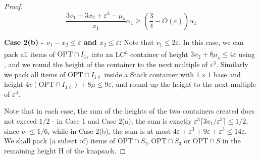 \documentclass[10pt,a4paper]{amsart}
\renewcommand{\epsilon}{\varepsilon} %
\theoremstyle{definition}
\newcommand{\HH}{\mathrm{H}}
\begin{document}
\begin{proof}
    
    
    \[ \frac{3v_1-3x_2+\epsilon^3-\mu_s}{x_1}\alpha_1 \ge \left(\frac{3}{4}-O(\epsilon)\right)\alpha_1 \]
    
    \textbf{Case 2(b) - $v_1-x_2 \le \epsilon$ and $x_2\le \epsilon$:} Note that $v_1\le 2\epsilon$. In this case, we can pack all items of $\text{OPT}\cap I_{1s}$ into an LC\textsuperscript{a} container of height $3x_2+8\mu_s \le 4\epsilon$ using , and we round the height of the container to the next multiple of $\epsilon^3$. Similarly we pack all items of $\text{OPT}\cap I_{1\ell}$ inside a Stack container with $1\times 1$ base and height $4v(\text{OPT}\cap I_{1\ell})+8\mu \le 9\epsilon$, and round up the height to the next multiple of $\epsilon^3$. 

    Note that in each case, the sum of the heights of the two containers created does not exceed $1/2$ - in Case 1 and Case 2(a), the sum is exactly $\epsilon^3\lceil 3v_1/\epsilon^3\rceil \le 1/2$, since $v_1\le 1/6$, while in Case 2(b), the sum is at most $4\epsilon + \epsilon^3+9\epsilon+\epsilon^3 \le 14\epsilon$. We shall pack (a subset of) items of $\text{OPT}\cap S_2, \text{OPT}\cap S_3$ or $\text{OPT}\cap S$ in the remaining height $\HH$ of the knapsack.


\end{proof}
\end{document}
